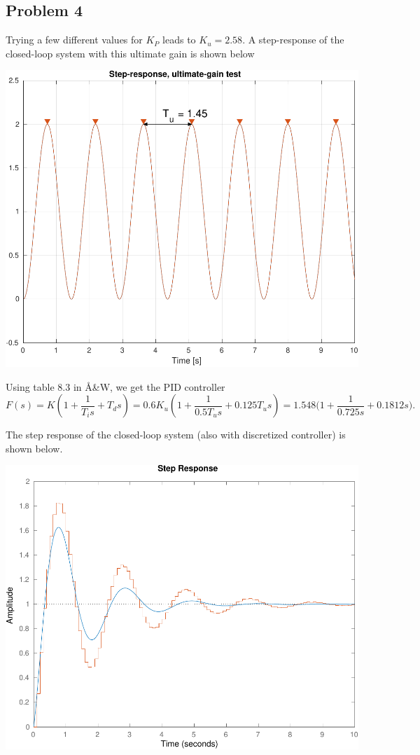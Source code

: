 \documentclass{scrartcl}
\begin{document}
\subsection*{Problem 4}
\label{sec:orgheadline14}
Trying a few different values for \(K_P\) leads to \(K_u = 2.58\). A step-response of the closed-loop system with this ultimate gain is shown below
\begin{center}
\includegraphics[width=0.6\linewidth]{ultimate_period_hw3_spring16}
\end{center}

Using table 8.3 in Å\&W, we get the PID controller
\[F(s) = K(1 + \frac{1}{T_is} + T_ds) = 0.6K_u(1 + \frac{1}{0.5T_us} + 0.125T_us) = 1.548\big(1 + \frac{1}{0.725s} +  0.1812 s\big). \]

The step response of the closed-loop system (also with discretized controller) is shown below.
\begin{center}
\includegraphics[width=0.6\linewidth]{tuned_response_hw3_spring16}
\end{center}
\end{document}
